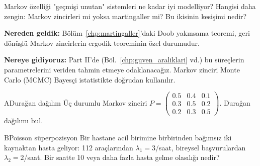 \begin{ozyansima}
Markov özelliği "geçmişi unutan" sistemleri ne kadar iyi modelliyor? Hangisi daha zengin: Markov zincirleri mi yoksa martingaller mi? Bu ikisinin kesişimi nedir?
\end{ozyansima}

\begin{kopru}
\textbf{Nereden geldik:} Bölüm~\ref{chp:martingaller}'daki Doob yakınsama teoremi, geri dönüşlü Markov zincirlerin ergodik teoreminin özel durumudur.

\textbf{Nereye gidiyoruz:} Part II'de (Böl.~\ref{chp:guven_araliklari} vd.) bu süreçlerin parametrelerini veriden tahmin etmeye odaklanacağız. Markov zinciri Monte Carlo (MCMC) Bayesçi istatistikte doğrudan kullanılır.
\end{kopru}


\cozumlualistirmalar

\begin{alistirma}[Al.10.1]{A}{Durağan dağılım}
Üç durumlu Markov zinciri $P=\begin{pmatrix}0.5&0.4&0.1\\0.3&0.5&0.2\\0.2&0.3&0.5\end{pmatrix}$. Durağan dağılımı bul.
\end{alistirma}

\begin{alistirma}[Al.10.2]{B}{Poisson süperpozisyon}
Bir hastane acil birimine birbirinden bağımsız iki kaynaktan hasta geliyor: 112 araçlarından $\lambda_1=3$/saat, bireysel başvurulardan $\lambda_2=2$/saat. Bir saatte 10 veya daha fazla hasta gelme olasılığı nedir?
\end{alistirma}


